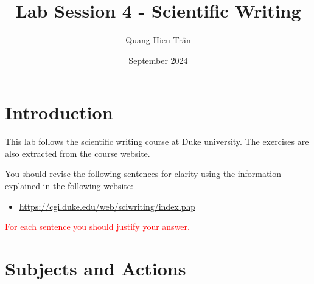 \documentclass{article}
\title{Lab Session 4 - Scientific Writing}
\author{Quang Hieu Trân}
\date{September 2024}
\newcommand{\red}[1]{\textcolor{red}{#1}}
\begin{document}
\maketitle

\section{Introduction}
This lab follows the scientific writing course at Duke university. The exercises are also extracted from the course website.

You should revise the following sentences for clarity using the information explained in the following website:
\begin{itemize}
    \item \url{https://cgi.duke.edu/web/sciwriting/index.php}
\end{itemize}

\red{For each sentence you should justify your answer.}

\section{Subjects and Actions}
\end{document}
